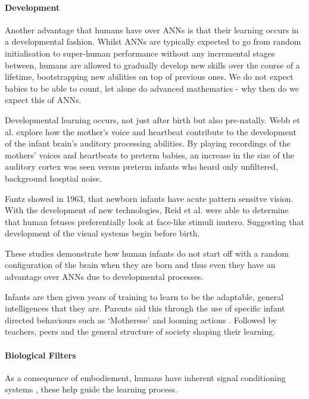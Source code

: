 \paragraph{Development}
Another advantage that humans have over \acp{ANN} is that their learning occurs in a developmental fashion. Whilst \acp{ANN} are typically expected to go from random initialisation to super-human performance without any incremental stages between, humans are allowed to gradually develop new skills over the course of a lifetime, bootstrapping new abilities on top of previous ones. We do not expect babies to be able to count, let alone do advanced mathematics - why then do we expect this of \acp{ANN}.

Developmental learning occurs, not just after birth but also pre-natally. Webb et al. \cite{webb2015mother} explore how the mother's voice and heartbeat contribute to the development of the infant brain's auditory processing abilities. By playing recordings of the mothers' voices and heartbeats to preterm babies, an increase in the size of the auditory cortex was seen versus preterm infants who heard only unfiltered, background hosptial noise.


Fantz \cite{fantz1963pattern} showed in 1963, that newborn infants have acute pattern sensitve vision. With the development of new technologies, Reid et al. \cite{reid2017human} were able to determine that human fetuses preferentially look at face-like stimuli inutero. Suggesting that development of the visual systems begin before birth.

These studies demonstrate how human infants do not start off with a random configuration of the brain when they are born and thus even they have an advantage over \acp{ANN} due to developmental processes.

Infants are then given years of training to learn to be the adaptable, general intelligences that they are. Parents aid this through the use of specific infant directed behaviours such as `Motherese' \cite{fernald1987acoustic} and looming actions \cite{lohan2012contingency, lohan2012tutor}. Followed by teachers, peers and the general structure of society shaping their learning.

\paragraph{Biological Filters}
As a consequence of embodiement, humans have inherent signal conditioning systems \cite{pezzulo2013computational}, these help guide the learning process.

